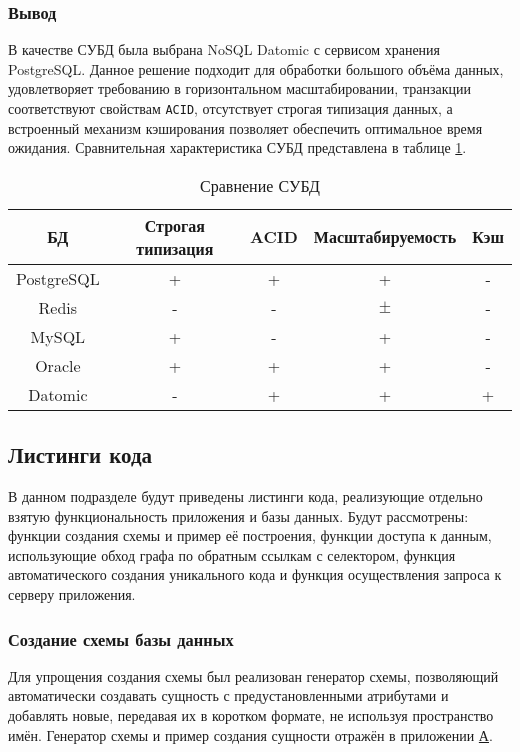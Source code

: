 \subsubsection*{Вывод}

В качестве СУБД была выбрана NoSQL Datomic с сервисом хранения PostgreSQL. Данное решение подходит для обработки большого объёма данных, удовлетворяет требованию в горизонтальном масштабировании, транзакции соответствуют свойствам \texttt{ACID}, отсутствует строгая типизация данных, а встроенный механизм кэширования позволяет обеспечить оптимальное время ожидания. Сравнительная характеристика СУБД представлена в таблице \ref{tab:dbs}.

\begin{table}[h]
	\begin{center}
		\caption{Сравнение СУБД}
		\label{tab:dbs}
		\begin{tabular}{|c|c|c|c|c|}
			\hline
			БД & Строгая типизация & ACID & Масштабируемость & Кэш \\
			\hline
			PostgreSQL & + & + & + & - \\ \hline
			Redis & - & - & $\pm$ & - \\ \hline
			MySQL & + & -  & + & - \\ \hline
			Oracle & + & + & + & - \\ \hline
			Datomic & - & + & + & + \\ \hline 
		\end{tabular}
	\end{center}
\end{table}

\subsection{Листинги кода}

В данном подразделе будут приведены листинги кода, реализующие отдельно взятую функциональность приложения и базы данных. Будут рассмотрены: функции создания схемы и пример её построения, функции доступа к данным, использующие обход графа по обратным ссылкам \cite{backref} с селектором, функция автоматического создания уникального кода и функция осуществления запроса к серверу приложения.

\subsubsection{Создание схемы базы данных}

Для упрощения создания схемы был реализован генератор схемы, позволяющий автоматически создавать сущность с предустановленными атрибутами и добавлять новые, передавая их в коротком формате, не используя пространство имён. Генератор схемы и пример создания сущности отражён в приложении \hyperref[app:schema]{А}. 

